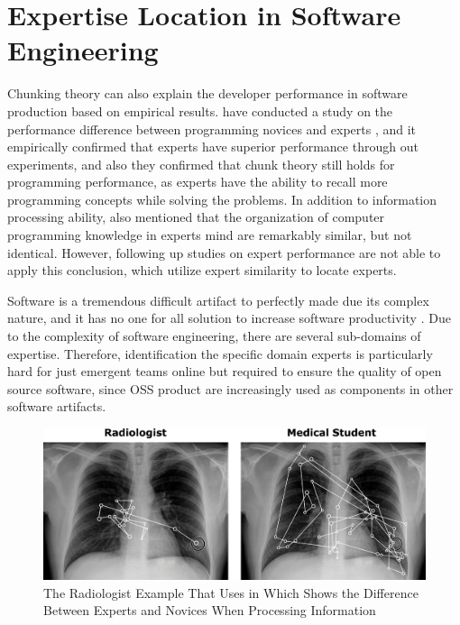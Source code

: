 \section{Expertise Location in Software Engineering}

Chunking theory can also explain the developer performance in software production based on empirical results. \citeauthor{MCKEITHEN1981307} have conducted a study on the performance difference between programming novices and experts \cite{MCKEITHEN1981307}, and it empirically confirmed that experts have superior performance through out experiments, and also they confirmed that chunk theory still holds for programming performance, as experts have the ability to recall more programming concepts while solving the problems. In addition to information processing ability, \citeauthor{MCKEITHEN1981307} also mentioned that the organization of computer programming knowledge in experts mind are remarkably similar, but not identical. However, following up studies on expert performance are not able to apply this conclusion, which utilize expert similarity to locate experts.

Software is a tremendous difficult artifact to perfectly made due its complex nature, and it has no one for all solution to increase software productivity \cite{brooks1987no}. Due to the complexity of software engineering, there are several sub-domains of expertise. Therefore, identification the specific domain experts is particularly hard for just emergent teams online but required to ensure the quality of open source software, since OSS product are increasingly used as components in other software artifacts.

\begin{figure}
\includegraphics[width = 0.8\columnwidth]{radiologist}
\centering
\caption{The Radiologist Example That \citeauthor{bilalić2017neuroscience} Uses in \cite{bilalić2017neuroscience} Which Shows the Difference Between Experts and Novices When Processing Information}
\label{radiologist}
\end{figure}

